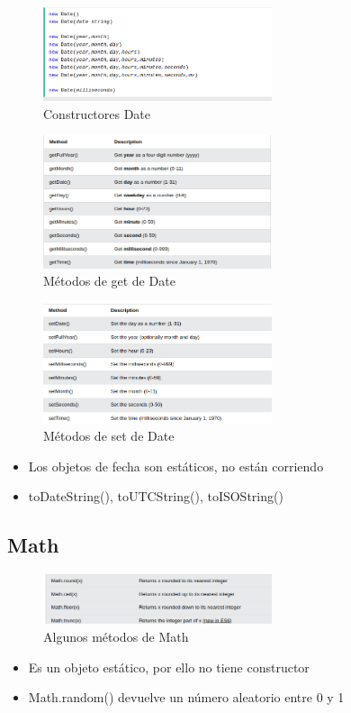 \documentclass{article}
\begin{document}
 \begin{figure}[H]
   \centering
   \includegraphics[width=0.6\textwidth]{table5.png}
   \caption{Constructores Date}
 \end{figure}

 \begin{figure}[H]
   \centering
   \includegraphics[width=0.6\textwidth]{table6.png}
   \caption{Métodos de get de Date}
 \end{figure}

 \begin{figure}[H]
   \centering
   \includegraphics[width=0.6\textwidth]{table7.png}
   \caption{Métodos de set de Date}
 \end{figure}

 \begin{itemize}
   \item Los objetos de fecha son estáticos, no están corriendo
   \item toDateString(), toUTCString(), toISOString()
 \end{itemize}

 \subsection{Math}
 \begin{figure}[H]
   \centering
   \includegraphics[width=0.6\textwidth]{table8.png}
   \caption{Algunos métodos de Math}
 \end{figure}
 \begin{itemize}
   \item Es un objeto estático, por ello no tiene constructor
   \item Math.random() devuelve un número aleatorio entre 0 y 1
 \end{itemize}
\end{document}
